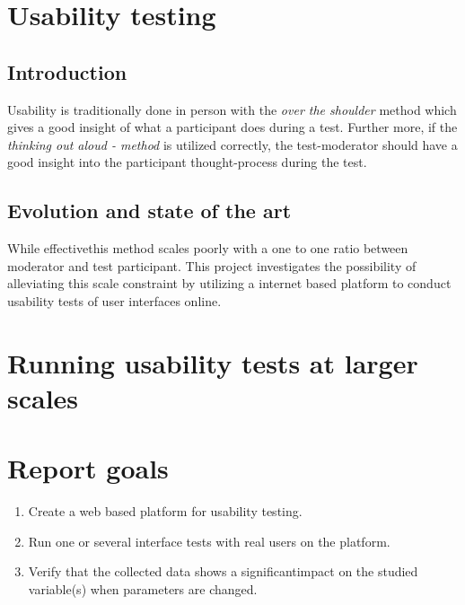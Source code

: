 \documentclass[nofilelist,dvipsnames]{cslthse-msc}
\begin{document}
  \section{Usability testing}

    \subsection{Introduction}

      Usability is traditionally done in person with the \textit{over the
        shoulder} method which gives a good insight of what a participant does
      during a test. Further more, if the \textit{thinking out aloud - method} is
      utilized correctly, the test-moderator should have a good insight into the
      participant thought-process during the test.

    \subsection{Evolution and state of the art}

      While effective\checkTruth this method scales poorly with a one to one ratio
      between moderator and test participant. This project investigates the
      possibility of alleviating this scale constraint by utilizing a internet
      based platform to conduct usability tests of user interfaces online.


  \section{Running usability tests at larger scales}


	\section{Report goals}

		\begin{enumerate}
			\item{Create a web based platform for usability testing.}
			\item{Run one or several interface tests with real users on the platform.}
			\item{
				Verify that the collected data shows a significant\checkTruth impact on the studied
				variable(s) when parameters are changed. 
			}
		\end{enumerate}
\end{document}

